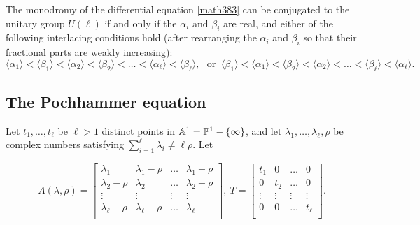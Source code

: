 \begin{theorem}
\notready\label{BHhere}\cite[Corollary 4.7]{BH}
The monodromy of the differential equation \eqref{math383} can be conjugated to the unitary group $U(\ell)$ if and only if the $\alpha_i$ and $\beta_i$ are real, and
either of the following interlacing conditions hold (after rearranging the $\alpha_i$ and $\beta_i$ so that their fractional parts are weakly increasing):
$$\langle\alpha_1\rangle <\langle\beta_1\rangle<\langle\alpha_2\rangle <\langle\beta_2\rangle<\dots<\langle\alpha_{\ell}\rangle <\langle\beta_{\ell}\rangle,\ \ \ \text {or }\ \langle\beta_1\rangle<\langle\alpha_1\rangle <\langle\beta_2\rangle<\langle\alpha_2\rangle <\dots<\langle\beta_{\ell}\rangle<\langle\alpha_{\ell}\rangle .$$
\end{theorem}

\subsection{The Pochhammer equation}\label{pokhie}
Let $t_1,\dots,t_{\ell}$ be $\ell>1$ distinct points in $\Bbb{A}^1=\Bbb{P}^1-\{\infty\}$, and let $\lambda_1,\dots,\lambda_{\ell},\rho$ be complex numbers
satisfying $\sum_{i=1}^{\ell}\lambda_i\neq \ell\rho$. Let

$$A(\lambda,\rho)=
  \left[ {\begin{array}{cccc}
   \lambda_1 & \lambda_1-\rho & \dots & \lambda_1-\rho \\
   \lambda_2-\rho & \lambda_2 &\dots  & \lambda_2-\rho\\
   \vdots & \vdots &\vdots & \vdots \\
   \lambda_{\ell}-\rho & \lambda_{\ell}-\rho & \dots & \lambda_{\ell}\\
\end{array} }\right],\  T= \left[ {\begin{array}{cccc}
   t_1 & 0 & \dots & 0 \\
   0 & t_2 &\dots  & 0\\
   \vdots & \vdots &\vdots & \vdots \\
   0 & 0 & \dots & t_{\ell}\\\end{array} }\right].$$

